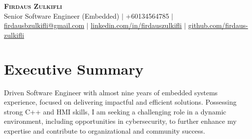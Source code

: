 \documentclass[a4paper,12pt]{article}
\begin{document}
\noindent %
\begin{minipage}{\textwidth} %
    \begin{minipage}{0.7\textwidth} %
        \begin{flushleft}
            \textbf{\Huge \scshape Firdaus Zulkifli} \\ \vspace{1pt}
            \small Senior Software Engineer (Embedded) $|$ +60134564785 $|$ \href{mailto:firdausbzulkifli@gmail.com}{\underline{firdausbzulkifli@gmail.com}} $|$
            \href{https://linkedin.com/in/firdauszulkifli}{\underline{linkedin.com/in/firdauszulkifli}} $|$
            \href{https://github.com/firdaus-zulkifli}{\underline{github.com/firdaus-zulkifli}}
      ~  \end{flushleft}
    \end{minipage}%
    \begin{minipage}{0.3\textwidth} %
        \begin{flushright}
        \end{flushright}
    \end{minipage}
\end{minipage}

\section{Executive Summary}
\vspace{3pt}
 \small Driven Software Engineer with almost nine years of embedded systems experience, focused on delivering impactful and efficient solutions. Possessing strong C++ and HMI skills, I am seeking a challenging role in a dynamic environment, including opportunities in cybersecurity, to further enhance my expertise and contribute to organizational and community success.
\end{document}
